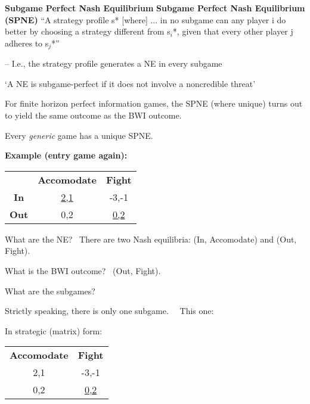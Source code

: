 \textbf{Subgame Perfect Nash Equilibrium}
\textbf{Subgame Perfect Nash Equilibrium (SPNE) }\textquotedblleft A
strategy profile s* [where] ... in no subgame can any player i do better by
choosing a strategy different from s$_{i}$*, given that every other player j
adheres to s$_{j}$*\textquotedblright

-- I.e., the strategy profile generates a NE in every subgame

`A NE is subgame-perfect if it does not involve a noncredible threat'

For finite horizon perfect information games, the SPNE (where unique) turns
out to yield the same outcome as the BWI outcome.

Every \emph{generic} game has a unique SPNE.


\textbf{Example (entry game again):}



\begin{tabular}{ccc}
& \textbf{Accomodate} & \textbf{Fight} \\
\textbf{In} & \underline{2,1} & -3,-1 \\
\textbf{Out} & 0,2 & \underline{0,2}%
\end{tabular}

What are the NE? \ There are two Nash equilibria: (In, Accomodate) and (Out,
Fight).

What is the BWI outcome? \ (Out, Fight).

\bigskip



What are the subgames?

Strictly speaking, there is only one subgame. \ \ This one:

In strategic (matrix) form:

\begin{tabular}{cc}
\textbf{Accomodate} & \textbf{Fight} \\
2,1 & -3,-1 \\
0,2 & \underline{0,2}%
\end{tabular}

